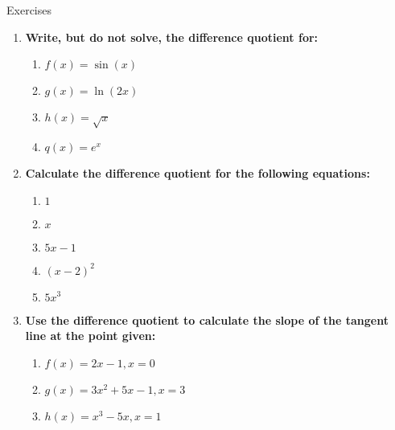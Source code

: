 \documentclass[../revisedmain.tex]{subfiles}
\begin{document}
	\begin{center}
		{\Large Exercises}
	\end{center}
	\begin{enumerate}
		\item \textbf{Write, but do not solve, the difference quotient for:}
		\begin{enumerate}
			\item \(f(x)=\sin(x)\)
			\item \(g(x)=\ln(2x)\)
			\item \(h(x)=\sqrt{x}\)
			\item \(q(x)=e^{x}\)
		\end{enumerate}
		\item \textbf{Calculate the difference quotient for the following equations:}
		\begin{enumerate}
			\item \(1\)
			\item \(x\)
			\item \(5x-1\)
			\item \((x-2)^2\)
			\item \(5x^3\)
		\end{enumerate}
		\item \textbf{Use the difference quotient to calculate the slope of the tangent line at the point given:}
		\begin{enumerate}
			\item \(f(x)=2x-1, x=0\)
			\item \(g(x)=3x^2+5x-1, x=3\)
			\item \(h(x)=x^3-5x, x=1\)
		\end{enumerate}
	\end{enumerate}
\end{document}
